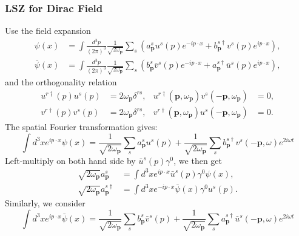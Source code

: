 \subsubsection{LSZ for Dirac Field}
Use the field expansion
\begin{equation}
\begin{aligned}
	\psi(x) &=\int \frac{d^{3} p}{(2 \pi)^{3}} \frac{1}{\sqrt{2 \omega_{\mathbf{p}}}} 
		\sum_{s}\left(a_{\mathbf{p}}^{s} u^{s}(p) e^{-i p \cdot x}
		+b_{\mathbf{p}}^{s \dagger} v^{s}(p) e^{i p \cdot x}\right), \\
	\bar{\psi}(x) &=\int \frac{d^{3} p}{(2 \pi)^{3}} \frac{1}{\sqrt{2 \omega_{\mathbf{p}}}} 
		\sum_{s}\left(b_{\mathbf{p}}^{s} \bar{v}^{s}(p) e^{-i p \cdot x}
		+a_{\mathbf{p}}^{s \dagger} \bar{u}^{s}(p) e^{i p \cdot x}\right),
\end{aligned}
\end{equation}
and the orthogonality relation
\begin{equation}
\begin{aligned}
	u^{r \dagger}(p) u^{s}(p) &= 2 \omega_{\bm p} \delta^{r s}, & 
	u^{r \dagger}(\bm p,\omega_{\bm p}) v^{s}(-\bm p,\omega_{\bm p}) &= 0,\\
	v^{r \dagger}(p) v^{s}(p) &= 2\omega_{\bm p} \delta^{r s}, & 
	v^{r \dagger}(\bm p,\omega_{\bm p}) u^{s}(-\bm p,\omega_{\bm p}) &= 0.
\end{aligned}
\end{equation}
The spatial Fourier transformation gives:
\begin{equation}
	\int d^3x e^{ip\cdot x}\psi(x) = \frac{1}{\sqrt{2\omega_{\bm p}}}\sum_s a^s_{\bm p}u^s(p) +\frac{1}{\sqrt{2\omega_{\bm p}}}\sum_s b^{s \dagger}_{\bm p} v^s(-\bm p,\omega) e^{2i\omega t}
\end{equation}
Left-multiply on both hand side by $\bar u^{s}(p) \gamma^0$, we then get
\begin{equation}
\begin{aligned}
	\sqrt{2\omega_{\bm p}}a^{s}_{\bm p} &= \int d^3 x e^{ip\cdot x}\bar u^{s}(p)\gamma^0 \psi(x), \\
	\sqrt{2\omega_{\bm p}}a^{s \dagger}_{\bm p} &= \int d^3 x e^{-ip\cdot x}\bar\psi(x)\gamma^0 u^{s}(p).
\end{aligned}
\end{equation}
Similarly, we consider
\begin{equation}
	\int d^3x e^{ip\cdot x}\bar\psi(x) = \frac{1}{\sqrt{2\omega_{\bm p}}}\sum_s b^s_{\bm p}\bar v^s(p) +\frac{1}{\sqrt{2\omega_{\bm p}}}\sum_s a^{s \dagger}_{\bm p} \bar u^s(-\bm p,\omega) e^{2i\omega t}
\end{equation}
